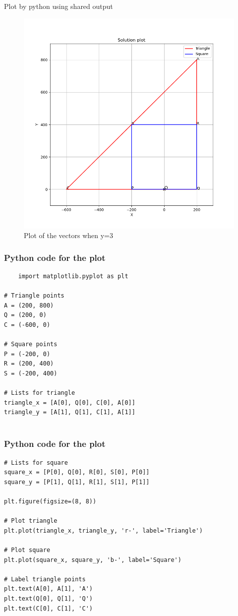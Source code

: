 \documentclass{beamer}
\begin{document}
\begin{frame}{Plot by python using shared output}
	\begin{center}
	\begin{figure}[H]
		\centering
		\includegraphics[width = 0.7\columnwidth]{figs/fig1.png}
		\caption{Plot of the vectors when y=3}
		\label{fig1}
	\end{figure}
	\end{center}
\end{frame}
\begin{frame}[fragile]
     \frametitle{Python code for the plot}
\begin{lstlisting}
    import matplotlib.pyplot as plt

# Triangle points
A = (200, 800)
Q = (200, 0)
C = (-600, 0)

# Square points
P = (-200, 0)
R = (200, 400)
S = (-200, 400)

# Lists for triangle
triangle_x = [A[0], Q[0], C[0], A[0]]
triangle_y = [A[1], Q[1], C[1], A[1]]


\end{lstlisting}
\end{frame}
\begin{frame}[fragile]
   \frametitle{Python code for the plot}
    \begin{lstlisting}
# Lists for square
square_x = [P[0], Q[0], R[0], S[0], P[0]]
square_y = [P[1], Q[1], R[1], S[1], P[1]]

plt.figure(figsize=(8, 8))

# Plot triangle
plt.plot(triangle_x, triangle_y, 'r-', label='Triangle')

# Plot square
plt.plot(square_x, square_y, 'b-', label='Square')

# Label triangle points
plt.text(A[0], A[1], 'A')
plt.text(Q[0], Q[1], 'Q')
plt.text(C[0], C[1], 'C')



 \end{lstlisting}
\end{frame}
\end{document}

